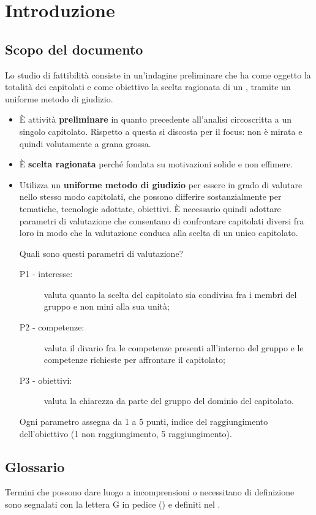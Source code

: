 \section{Introduzione}

\subsection{Scopo del documento}
Lo studio di fattibilità consiste in un'indagine preliminare che ha come oggetto la totalità dei capitolati e come obiettivo la scelta ragionata di un , tramite un uniforme metodo di giudizio. 
\begin{itemize}
	\item È attività \textbf{preliminare} in quanto precedente all'analisi circoscritta a un singolo capitolato. Rispetto a questa si discosta per il focus: non è mirata e quindi volutamente a grana grossa. 
	\item È \textbf{scelta ragionata} perché fondata su motivazioni solide e non effimere.
	\item Utilizza un \textbf{uniforme metodo di giudizio} per essere in grado di valutare nello stesso modo capitolati, che possono differire sostanzialmente per tematiche, tecnologie adottate, obiettivi. È necessario quindi adottare parametri di valutazione che consentano di confrontare capitolati diversi fra loro in modo che la valutazione conduca alla scelta di un unico capitolato. 
	
	Quali sono questi parametri di valutazione? 
	\begin{description}
		\item[P1 - interesse:] valuta quanto la scelta del capitolato sia condivisa fra i membri del gruppo e non mini alla sua unità;
		\item[P2 - competenze:] valuta il divario fra le competenze presenti all'interno del gruppo e le competenze richieste per affrontare il capitolato;
		\item[P3 - obiettivi:] valuta la chiarezza da parte del gruppo del dominio del capitolato. 
	\end{description}
	Ogni parametro assegna da 1 a 5 punti, indice del raggiungimento dell'obiettivo (1 non raggiungimento, 5 raggiungimento).
\end{itemize}


\subsection{Glossario}
Termini che possono dare luogo a incomprensioni o necessitano di definizione sono segnalati con la lettera G in pedice (\glock{ }) e definiti nel . 

